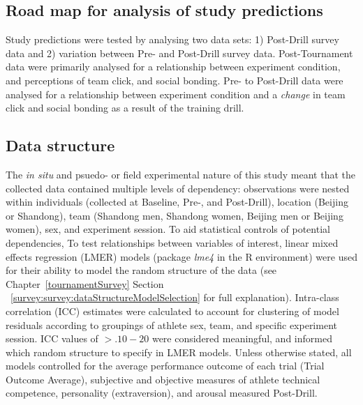 \subsection{Road map for analysis of study predictions}
Study predictions were tested by analysing two data sets: 1) Post-Drill survey data and 2) variation between Pre- and Post-Drill survey data.  Post-Tournament data were primarily analysed for a relationship between experiment condition, and perceptions of team click, and social bonding.  Pre- to Post-Drill data were analysed for a relationship between experiment condition and a \textit{change} in team click and social bonding as a result of the training drill.


\subsection{Data structure}
The \textit{in situ} and psuedo- or field experimental nature of this study meant that the collected data contained multiple levels of dependency: observations were nested within individuals (collected at Baseline, Pre-, and Post-Drill), location (Beijing or Shandong), team (Shandong men, Shandong women, Beijing men or Beijing women), sex, and experiment session.  To aid statistical controls of potential dependencies, To test relationships between variables of interest, linear mixed effects regression (LMER) models (package \textit{lme4} in the R environment) were used for their ability to model the random structure of the data (see Chapter~\ref{tournamentSurvey} Section ~\ref{survey:survey:dataStructureModelSelection} for full explanation).  Intra-class correlation (ICC) estimates were calculated to account for clustering of model residuals according to groupings of athlete sex, team, and specific experiment session. ICC values of $>.10-20$ were considered meaningful, and informed which random structure to specify in LMER models.   Unless otherwise stated, all models controlled for the average performance outcome of each trial (Trial Outcome Average), subjective and objective measures of athlete technical competence, personality (extraversion), and arousal measured Post-Drill.



